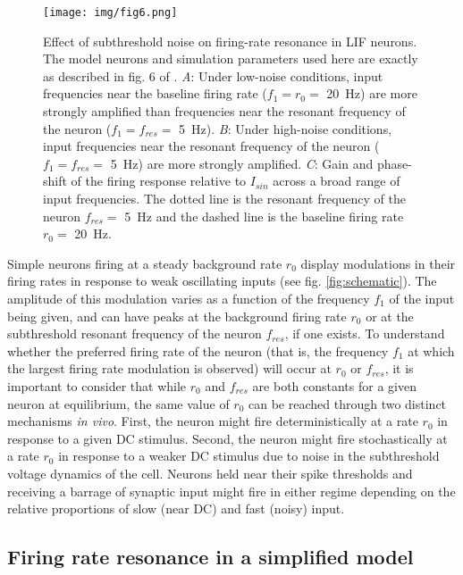 \documentclass[12pt]{article}
\begin{document}
\begin{figure}
    \texttt{[image: img/fig6.png]}
    \caption[Noise-dependent firing resonance in LIF neurons]{
        Effect of subthreshold noise on firing-rate resonance in LIF neurons.
        The model neurons and simulation parameters used here are exactly as described in fig. 6 of \cite{richardson_subthreshold_2003}.
        \textit{A}: Under low-noise conditions, input frequencies near the baseline firing rate ($f_1 = r_0 = $ \SI{20}{\Hz}) are more strongly amplified than frequencies near the resonant frequency of the neuron ($f_1 = f_{res} = $ \SI{5}{\Hz}).
        \textit{B}: Under high-noise conditions, input frequencies near the resonant frequency of the neuron ($f_1 = f_{res} = $ \SI{5}{\Hz}) are more strongly amplified.
        \textit{C}: Gain and phase-shift of the firing response relative to $I_{sin}$ across a broad range of input frequencies.
        The dotted line is the resonant frequency of the neuron $f_{res} = $ \SI{5}{\Hz} and the dashed line is the baseline firing rate $r_0 = $ \SI{20}{\Hz}.
        }
    \label{fig:lif_res}
\end{figure}

Simple neurons firing at a steady background rate $r_0$ display modulations in their firing rates in response to weak oscillating inputs (see fig. \ref{fig:schematic}).
The amplitude of this modulation varies as a function of the frequency $f_1$ of the input being given, and can have peaks at the background firing rate $r_0$ or at the subthreshold resonant frequency of the neuron $f_{res}$, if one exists.
To understand whether the preferred firing rate of the neuron (that is, the frequency $f_1$ at which the largest firing rate modulation is observed) will occur at $r_0$ or $f_{res}$, it is important to consider that while $r_0$ and $f_{res}$ are both constants for a given neuron at equilibrium, the same value of $r_0$ can be reached through two distinct mechanisms \textit{in vivo}.
First, the neuron might fire deterministically at a rate $r_0$ in response to a given DC stimulus.
Second, the neuron might fire stochastically at a rate $r_0$ in response to a weaker DC stimulus due to noise in the subthreshold voltage dynamics of the cell.
Neurons held near their spike thresholds and receiving a barrage of synaptic input might fire in either regime depending on the relative proportions of slow (near DC) and fast (noisy) input.

\subsection{Firing rate resonance in a simplified model}
\end{document}
